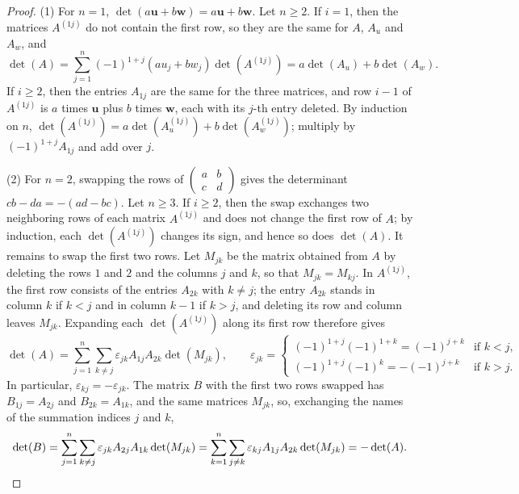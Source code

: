 \documentclass[11pt]{article}
\theoremstyle{definition}
\theoremstyle{plain}
\theoremstyle{remark}
\begin{document}
\begin{proof}
    (1) For $n = 1$, $\det(a\mathbf{u} + b\mathbf{w}) = a\mathbf{u} + b\mathbf{w}$. Let $n \geq 2$. If $i = 1$, then the matrices $A^{(1j)}$ do not contain the first row, so they are the same for $A$, $A_u$ and $A_w$, and
    \[\det(A) = \sum_{j=1}^n (-1)^{1+j}(au_j + bw_j)\det(A^{(1j)}) = a\det(A_u) + b\det(A_w).\]
    If $i \geq 2$, then the entries $A_{1j}$ are the same for the three matrices, and row $i - 1$ of $A^{(1j)}$ is $a$ times $\mathbf{u}$ plus $b$ times $\mathbf{w}$, each with its $j$-th entry deleted. By induction on $n$, $\det(A^{(1j)}) = a\det(A_u^{(1j)}) + b\det(A_w^{(1j)})$; multiply by $(-1)^{1+j}A_{1j}$ and add over $j$.

    (2) For $n = 2$, swapping the rows of $\begin{pmatrix} a & b \\ c & d \end{pmatrix}$ gives the determinant $cb - da = -(ad - bc)$. Let $n \geq 3$. If $i \geq 2$, then the swap exchanges two neighboring rows of each matrix $A^{(1j)}$ and does not change the first row of $A$; by induction, each $\det(A^{(1j)})$ changes its sign, and hence so does $\det(A)$. It remains to swap the first two rows. Let $M_{jk}$ be the matrix obtained from $A$ by deleting the rows $1$ and $2$ and the columns $j$ and $k$, so that $M_{jk} = M_{kj}$. In $A^{(1j)}$, the first row consists of the entries $A_{2k}$ with $k \neq j$; the entry $A_{2k}$ stands in column $k$ if $k < j$ and in column $k - 1$ if $k > j$, and deleting its row and column leaves $M_{jk}$. Expanding each $\det(A^{(1j)})$ along its first row therefore gives
    \[\det(A) = \sum_{j=1}^n \sum_{k \neq j} \varepsilon_{jk} A_{1j}A_{2k}\det(M_{jk}), \qquad \varepsilon_{jk} = \begin{cases} (-1)^{1+j}(-1)^{1+k} = (-1)^{j+k} & \text{if } k < j, \\ (-1)^{1+j}(-1)^{k} = -(-1)^{j+k} & \text{if } k > j. \end{cases}\]
    In particular, $\varepsilon_{kj} = -\varepsilon_{jk}$. The matrix $B$ with the first two rows swapped has $B_{1j} = A_{2j}$ and $B_{2k} = A_{1k}$, and the same matrices $M_{jk}$, so, exchanging the names of the summation indices $j$ and $k$,
    \[\det(B) = \sum_{j=1}^n \sum_{k \neq j} \varepsilon_{jk} A_{2j}A_{1k}\det(M_{jk}) = \sum_{k=1}^n \sum_{j \neq k} \varepsilon_{kj} A_{1j}A_{2k}\det(M_{jk}) = -\det(A). \qedhere\]
\end{proof}
\end{document}
